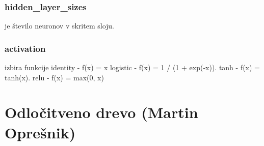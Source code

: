 \documentclass[a4paper,11pt]{article}
\begin{document}
	\subsubsection{hidden_layer_sizes}
		je število neuronov v skritem sloju.

	\subsubsection{activation}
		izbira funkcije
		identity - f(x) = x
		logistic - f(x) = 1 / (1 + exp(-x)).
		tanh - f(x) = tanh(x).
		relu - f(x) = max(0, x)
 
\section{Odločitveno drevo (Martin Oprešnik) }
\end{document}
